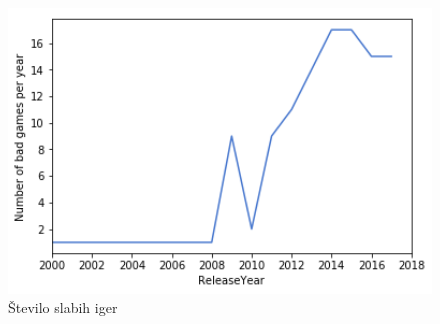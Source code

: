 \documentclass[a4paper]{article}
\begin{document}
\begin{figure}[h]
    \centering
    \begin{minipage}{0.45\textwidth}
				\caption{Število slabih iger}
			\includegraphics[width=1\textwidth,keepaspectratio]{graf_SlabeIgre_leto.png}


\end{minipage}
\end{figure}
\end{document}
